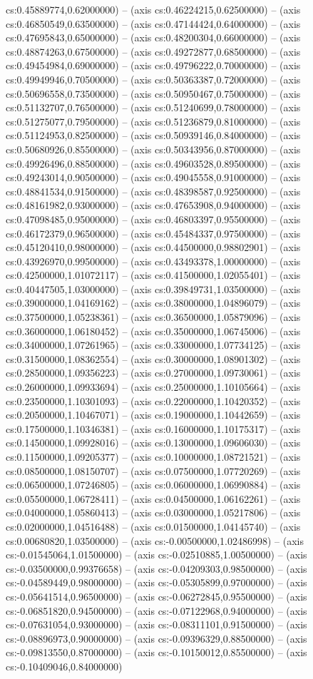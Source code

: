 cs:0.45889774,0.62000000) -- (axis cs:0.46224215,0.62500000) -- (axis cs:0.46850549,0.63500000) -- (axis cs:0.47144424,0.64000000) -- (axis cs:0.47695843,0.65000000) -- (axis cs:0.48200304,0.66000000) -- (axis cs:0.48874263,0.67500000) -- (axis cs:0.49272877,0.68500000) -- (axis cs:0.49454984,0.69000000) -- (axis cs:0.49796222,0.70000000) -- (axis cs:0.49949946,0.70500000) -- (axis cs:0.50363387,0.72000000) -- (axis cs:0.50696558,0.73500000) -- (axis cs:0.50950467,0.75000000) -- (axis cs:0.51132707,0.76500000) -- (axis cs:0.51240699,0.78000000) -- (axis cs:0.51275077,0.79500000) -- (axis cs:0.51236879,0.81000000) -- (axis cs:0.51124953,0.82500000) -- (axis cs:0.50939146,0.84000000) -- (axis cs:0.50680926,0.85500000) -- (axis cs:0.50343956,0.87000000) -- (axis cs:0.49926496,0.88500000) -- (axis cs:0.49603528,0.89500000) -- (axis cs:0.49243014,0.90500000) -- (axis cs:0.49045558,0.91000000) -- (axis cs:0.48841534,0.91500000) -- (axis cs:0.48398587,0.92500000) -- (axis cs:0.48161982,0.93000000) -- (axis cs:0.47653908,0.94000000) -- (axis cs:0.47098485,0.95000000) -- (axis cs:0.46803397,0.95500000) -- (axis cs:0.46172379,0.96500000) -- (axis cs:0.45484337,0.97500000) -- (axis cs:0.45120410,0.98000000) -- (axis cs:0.44500000,0.98802901) -- (axis cs:0.43926970,0.99500000) -- (axis cs:0.43493378,1.00000000) -- (axis cs:0.42500000,1.01072117) -- (axis cs:0.41500000,1.02055401) -- (axis cs:0.40447505,1.03000000) -- (axis cs:0.39849731,1.03500000) -- (axis cs:0.39000000,1.04169162) -- (axis cs:0.38000000,1.04896079) -- (axis cs:0.37500000,1.05238361) -- (axis cs:0.36500000,1.05879096) -- (axis cs:0.36000000,1.06180452) -- (axis cs:0.35000000,1.06745006) -- (axis cs:0.34000000,1.07261965) -- (axis cs:0.33000000,1.07734125) -- (axis cs:0.31500000,1.08362554) -- (axis cs:0.30000000,1.08901302) -- (axis cs:0.28500000,1.09356223) -- (axis cs:0.27000000,1.09730061) -- (axis cs:0.26000000,1.09933694) -- (axis cs:0.25000000,1.10105664) -- (axis cs:0.23500000,1.10301093) -- (axis cs:0.22000000,1.10420352) -- (axis cs:0.20500000,1.10467071) -- (axis cs:0.19000000,1.10442659) -- (axis cs:0.17500000,1.10346381) -- (axis cs:0.16000000,1.10175317) -- (axis cs:0.14500000,1.09928016) -- (axis cs:0.13000000,1.09606030) -- (axis cs:0.11500000,1.09205377) -- (axis cs:0.10000000,1.08721521) -- (axis cs:0.08500000,1.08150707) -- (axis cs:0.07500000,1.07720269) -- (axis cs:0.06500000,1.07246805) -- (axis cs:0.06000000,1.06990884) -- (axis cs:0.05500000,1.06728411) -- (axis cs:0.04500000,1.06162261) -- (axis cs:0.04000000,1.05860413) -- (axis cs:0.03000000,1.05217806) -- (axis cs:0.02000000,1.04516488) -- (axis cs:0.01500000,1.04145740) -- (axis cs:0.00680820,1.03500000) -- (axis cs:-0.00500000,1.02486998) -- (axis cs:-0.01545064,1.01500000) -- (axis cs:-0.02510885,1.00500000) -- (axis cs:-0.03500000,0.99376658) -- (axis cs:-0.04209303,0.98500000) -- (axis cs:-0.04589449,0.98000000) -- (axis cs:-0.05305899,0.97000000) -- (axis cs:-0.05641514,0.96500000) -- (axis cs:-0.06272845,0.95500000) -- (axis cs:-0.06851820,0.94500000) -- (axis cs:-0.07122968,0.94000000) -- (axis cs:-0.07631054,0.93000000) -- (axis cs:-0.08311101,0.91500000) -- (axis cs:-0.08896973,0.90000000) -- (axis cs:-0.09396329,0.88500000) -- (axis cs:-0.09813550,0.87000000) -- (axis cs:-0.10150012,0.85500000) -- (axis cs:-0.10409046,0.84000000) 
